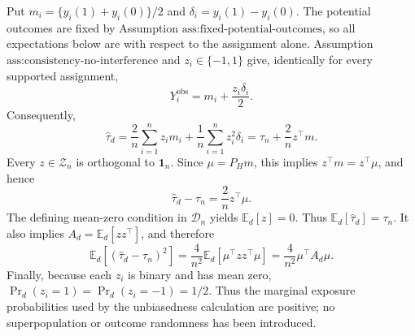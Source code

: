 Put \(m_i=\{y_i(1)+y_i(0)\}/2\) and \(\delta_i=y_i(1)-y_i(0)\).  The potential outcomes are fixed by Assumption \(\text{ass:fixed-potential-outcomes}\), so all expectations below are with respect to the assignment alone.  Assumption \(\text{ass:consistency-no-interference}\) and \(z_i\in\{-1,1\}\) give, identically for every supported assignment,
\[
Y_i^{\mathrm{obs}}=m_i+\frac{z_i\delta_i}{2}.
\]
Consequently,
\[
\widehat\tau_d
=\frac{2}{n}\sum_{i=1}^n z_i m_i+\frac{1}{n}\sum_{i=1}^n z_i^2\delta_i
=\tau_n+\frac{2}{n}z^\top m.
\]
Every \(z\in\mathcal Z_n\) is orthogonal to \(\mathbf 1_n\).  Since \(\mu=P_Hm\), this implies \(z^\top m=z^\top\mu\), and hence
\[
\widehat\tau_d-\tau_n=\frac{2}{n}z^\top\mu.
\]
The defining mean-zero condition in \(\mathcal D_n\) yields \(\mathbb E_d[z]=0\).  Thus \(\mathbb E_d[\widehat\tau_d]=\tau_n\).  It also implies \(A_d=\mathbb E_d[zz^\top]\), and therefore
\[
\mathbb E_d[(\widehat\tau_d-\tau_n)^2]
=\frac{4}{n^2}\mathbb E_d[\mu^\top zz^\top\mu]
=\frac{4}{n^2}\mu^\top A_d\mu.
\]
Finally, because each \(z_i\) is binary and has mean zero, \(\Pr_d(z_i=1)=\Pr_d(z_i=-1)=1/2\).  Thus the marginal exposure probabilities used by the unbiasedness calculation are positive; no superpopulation or outcome randomness has been introduced.